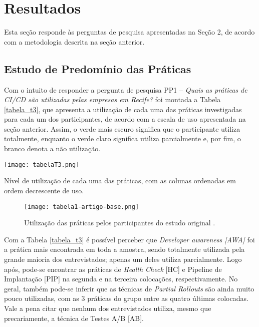 \section{Resultados}

Esta seção responde às perguntas de pesquisa apresentadas na Seção 2, de acordo com a metodologia descrita na seção anterior.

\subsection{Estudo de Predomínio das Práticas}

Com o intuito de responder a pergunta de pesquisa PP1 -- \emph{Quais as práticas de CI/CD são utilizadas pelas empresas em Recife?} foi montada a Tabela \ref{tabela_t3}, que apresenta a utilização de cada uma das práticas investigadas para cada um dos participantes, de acordo com a escala de uso apresentada na seção anterior. Assim, o verde mais escuro significa que o participante utiliza totalmente, enquanto o verde claro significa utiliza parcialmente e, por fim, o branco denota a não utilização.

\begin{table}[ht]
\begin{center}
\texttt{[image: tabelaT3.png]}
\end{center}
\caption[Nível de utilização das práticas, com as colunas em ordem decrescente de uso]{
    Nível de utilização de cada uma das práticas, com as colunas ordenadas em ordem decrescente de uso.
}\label{tabela_t3}
\end{table}

\begin{figure}[ht]
\begin{center}
\texttt{[image: tabela1-artigo-base.png]}
\end{center}
\caption[Tabela 1 do estudo original]{
    Utilização das práticas pelos participantes do estudo original \cite{empiricalStudy2016}.
}\label{tabela_1_artigo_base}
\end{figure}

Com a Tabela \ref{tabela_t3} é possível perceber que \emph{Developer awareness [AWA]} foi a prática mais encontrada em toda a amostra, sendo totalmente utilizada pela grande maioria dos entrevistados; apenas um deles utiliza parcialmente. Logo após, pode-se encontrar as práticas de \emph{Health Check} [HC] e Pipeline de Implantação [PIP]  na segunda e na terceira colocações, respectivamente. No geral, também pode-se inferir que as técnicas de \emph{Partial Rollouts} são ainda muito pouco utilizadas, com as 3 práticas do grupo entre as quatro últimas colocadas. Vale a pena citar que nenhum dos entrevistados utiliza, mesmo que precariamente, a técnica de Testes A/B [AB].

